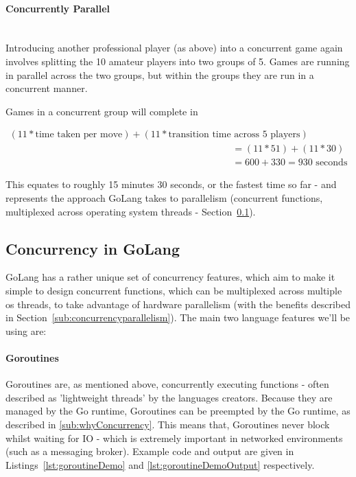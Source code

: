 \paragraph{Concurrently Parallel} \mbox{}\\

Introducing another professional player (as above) into a concurrent game again
involves splitting the 10 amateur players into two groups of 5. Games are
running in parallel across the two groups, but within the groups they are run in
a concurrent manner.

Games in a concurrent group will complete in

\begin{equation}
  \begin{split}
    (11 * \text{time taken per move}) + (11 * \text{transition time across 5 players}) \\
    &= (11 * 51) + (11 * 30) \\
    &= 600 + 330 = 930 \text{ seconds}
  \end{split}
\end{equation}

This equates to roughly 15 minutes 30 seconds, or the fastest time so far - and
represents the approach GoLang takes to parallelism (concurrent functions,
multiplexed across operating system threads -
Section~\ref{sub:golangConcurrency}).

\subsection{Concurrency in GoLang}
\label{sub:golangConcurrency}

GoLang has a rather unique set of concurrency features, which aim to make it
simple to design concurrent functions, which can be multiplexed across multiple
\gls{os} threads, to take advantage of hardware parallelism (with the benefits
described in Section~\ref{sub:concurrencyparallelism}). The main two language features we'll be using are:

\paragraph{Goroutines}

Goroutines are, as mentioned above, concurrently executing functions - often
described as 'lightweight threads' by the languages creators.
Because they are managed by the Go runtime, Goroutines can be \gls{preempted} by
the Go runtime, as described in \ref{sub:whyConcurrency}. This means that,
Goroutines never block whilst waiting for IO - which is extremely important in
networked environments (such as a messaging broker). Example code and output are
given in Listings~\ref{lst:goroutineDemo} and \ref{lst:goroutineDemoOutput}
respectively.

